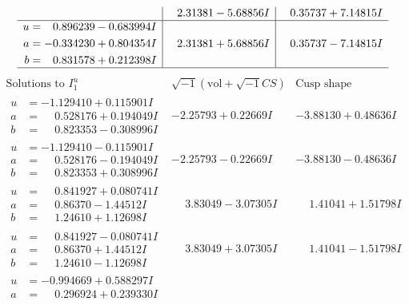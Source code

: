 \documentclass[1p]{elsarticle_modified}
\theoremstyle{definition}
\newcommand{\I}{\sqrt{-1}}
\begin{document}
$$\begin{array}{c|c|c}
 & \phantom{-}2.31381 - 5.68856 I & \phantom{-}0.35737 + 7.14815 I \\ \hline\begin{aligned}
u &= \phantom{-}0.896239 - 0.683994 I \\
a &= -0.334230 + 0.804354 I \\
b &= \phantom{-}0.831578 + 0.212398 I\end{aligned}
 & \phantom{-}2.31381 + 5.68856 I & \phantom{-}0.35737 - 7.14815 I\\
 \hline 
 \end{array}$$\newpage$$\begin{array}{c|c|c}  
\text{Solutions to }I^u_{1}& \I (\text{vol} + \sqrt{-1}CS) & \text{Cusp shape}\\
 \hline 
\begin{aligned}
u &= -1.129410 + 0.115901 I \\
a &= \phantom{-}0.528176 + 0.194049 I \\
b &= \phantom{-}0.823353 - 0.308996 I\end{aligned}
 & -2.25793 + 0.22669 I & -3.88130 + 0.48636 I \\ \hline\begin{aligned}
u &= -1.129410 - 0.115901 I \\
a &= \phantom{-}0.528176 - 0.194049 I \\
b &= \phantom{-}0.823353 + 0.308996 I\end{aligned}
 & -2.25793 - 0.22669 I & -3.88130 - 0.48636 I \\ \hline\begin{aligned}
u &= \phantom{-}0.841927 + 0.080741 I \\
a &= \phantom{-}0.86370 - 1.44512 I \\
b &= \phantom{-}1.24610 + 1.12698 I\end{aligned}
 & \phantom{-}3.83049 - 3.07305 I & \phantom{-}1.41041 + 1.51798 I \\ \hline\begin{aligned}
u &= \phantom{-}0.841927 - 0.080741 I \\
a &= \phantom{-}0.86370 + 1.44512 I \\
b &= \phantom{-}1.24610 - 1.12698 I\end{aligned}
 & \phantom{-}3.83049 + 3.07305 I & \phantom{-}1.41041 - 1.51798 I \\ \hline\begin{aligned}
u &= -0.994669 + 0.588297 I \\
a &= \phantom{-}0.296924 + 0.239330 I \\

\end{aligned}
\end{array}$$
\end{document}
